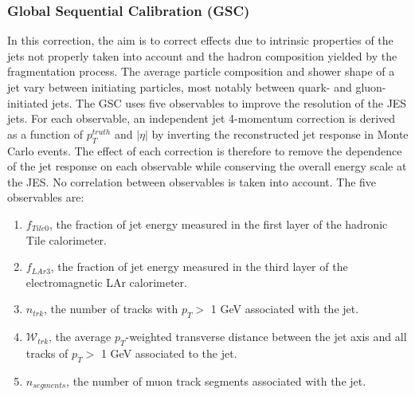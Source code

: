 \subsubsection{Global Sequential Calibration (GSC)}
\label{Jet:Cal:chain:GSC}
In this correction, the aim is to correct effects due to intrinsic properties of the jets not properly taken into account and the hadron composition yielded by the fragmentation process. The average particle composition and shower shape of a jet vary between initiating particles, most notably between quark- and gluon-initiated jets. The GSC uses five observables to improve the resolution of the JES jets. For each observable, an independent jet 4-momentum correction is derived as a function of $p_{T}^{truth}$ and $|\eta|$ by inverting the reconstructed jet response in Monte Carlo events. The effect of each correction is therefore to remove the dependence of the jet response on each observable while conserving the overall energy scale at the JES. No correlation between observables is taken into account. The five observables are:
\begin{enumerate}
    \item $f_{Tile0}$, the fraction of jet energy measured in the first layer of the hadronic Tile calorimeter.
    \item $f_{LAr3}$, the fraction of jet energy measured in the third layer of the electromagnetic LAr calorimeter.
    \item $n_{trk}$, the number of tracks with $p_T>$ 1 GeV associated with the jet.
    \item $\mathcal{W}_{trk}$, the average $p_T$-weighted transverse distance between the jet axis and all tracks of $p_T>$ 1 GeV associated to the jet.
    \item $n_{segments}$, the number of muon track segments associated with the jet.
\end{enumerate}

